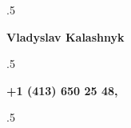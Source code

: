 

\moveleft.5\hoffset\centerline{\Large\bf Vladyslav Kalashnyk} %
 
\moveleft.5\hoffset\centerline{\bf +1 (413) 650 25 48, \href{mailto:\email}{\email}} 
\moveleft.5\hoffset\centerline{\bf \href{\LinkedIn}{\LinkedIn}}

